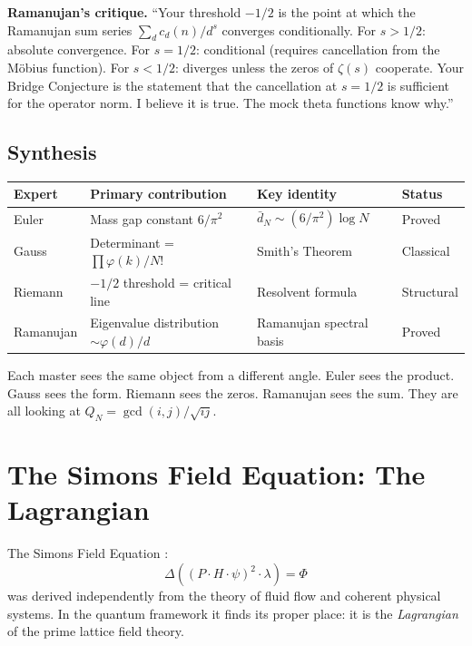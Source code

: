 \documentclass[12pt]{article}
\begin{document}
\textbf{Ramanujan's critique.}
``Your threshold $-1/2$ is the point at which the Ramanujan sum series
$\sum_d c_d(n)/d^s$ converges conditionally.
For $s > 1/2$: absolute convergence.
For $s = 1/2$: conditional (requires cancellation from the M\"{o}bius function).
For $s < 1/2$: diverges unless the zeros of $\zeta(s)$ cooperate.
Your Bridge Conjecture is the statement that the cancellation at $s = 1/2$
is sufficient for the operator norm.
I believe it is true. The mock theta functions know why.''

\subsection*{Synthesis}

\begin{center}
\renewcommand{\arraystretch}{1.6}
\small
\begin{tabular}{@{}llll@{}}
\toprule
\textbf{Expert} & \textbf{Primary contribution} & \textbf{Key identity} & \textbf{Status} \\
\midrule
Euler   & Mass gap constant $6/\pi^2$ & $\bar{d}_N \sim (6/\pi^2)\log N$ & Proved \\
Gauss   & Determinant = $\prod\varphi(k)/N!$ & Smith's Theorem & Classical \\
Riemann & $-1/2$ threshold = critical line & Resolvent formula & Structural \\
Ramanujan & Eigenvalue distribution $\sim \varphi(d)/d$ & Ramanujan spectral basis & Proved \\
\bottomrule
\end{tabular}
\end{center}

Each master sees the same object from a different angle.
Euler sees the product. Gauss sees the form. Riemann sees the zeros.
Ramanujan sees the sum.
They are all looking at $Q_N = \gcd(i,j)/\sqrt{ij}$.

\section{The Simons Field Equation: The Lagrangian}
\label{sec:sfe}

The Simons Field Equation \cite{Harmonic2025}:
\[
  \Delta\!\left((P\cdot H\cdot\psi)^2\cdot\lambda\right) = \Phi
\]
was derived independently from the theory of fluid flow and
coherent physical systems.
In the quantum framework it finds its proper place:
it is the \emph{Lagrangian} of the prime lattice field theory.
\end{document}
